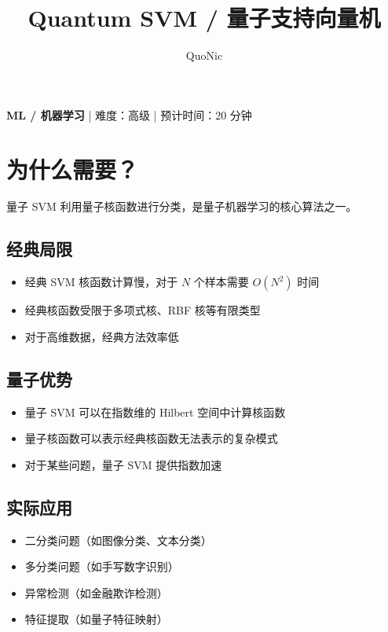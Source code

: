 \documentclass[12pt,a4paper]{article}
\title{Quantum SVM / 量子支持向量机}
\author{QuoNic}
\date{}
\begin{document}
\maketitle

\begin{center}
\textbf{ML / 机器学习} | 难度：高级 | 预计时间：20 分钟
\end{center}

\tableofcontents
\newpage

\section{为什么需要？}

量子 SVM 利用量子核函数进行分类，是量子机器学习的核心算法之一。

\subsection{经典局限}
\begin{itemize}
  \item 经典 SVM 核函数计算慢，对于 $N$ 个样本需要 $O(N^2)$ 时间
  \item 经典核函数受限于多项式核、RBF 核等有限类型
  \item 对于高维数据，经典方法效率低
\end{itemize}

\subsection{量子优势}
\begin{itemize}
  \item 量子 SVM 可以在指数维的 Hilbert 空间中计算核函数
  \item 量子核函数可以表示经典核函数无法表示的复杂模式
  \item 对于某些问题，量子 SVM 提供指数加速
\end{itemize}

\subsection{实际应用}
\begin{itemize}
  \item 二分类问题（如图像分类、文本分类）
  \item 多分类问题（如手写数字识别）
  \item 异常检测（如金融欺诈检测）
  \item 特征提取（如量子特征映射）
\end{itemize}
\end{document}
